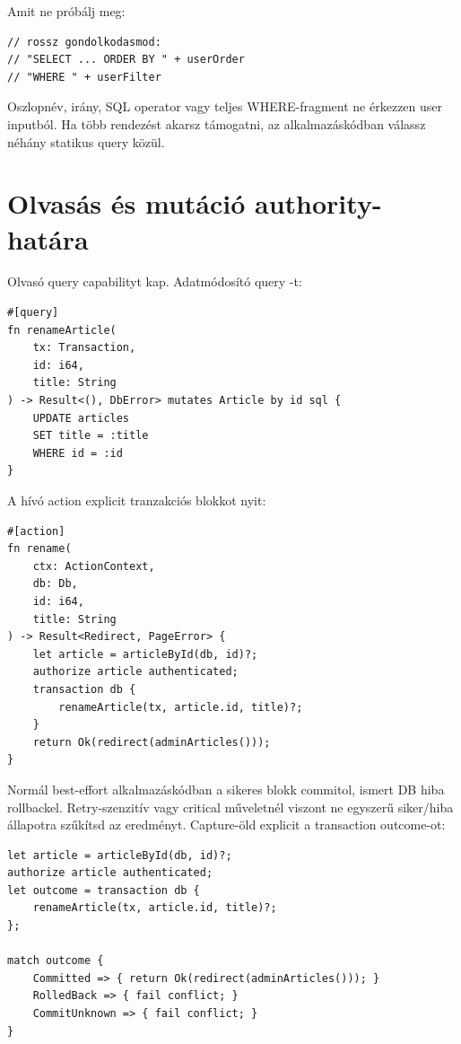 Amit ne próbálj meg:

\begin{lstlisting}
// rossz gondolkodasmod:
// "SELECT ... ORDER BY " + userOrder
// "WHERE " + userFilter
\end{lstlisting}

Oszlopnév,  irány, SQL operator vagy teljes WHERE-fragment ne érkezzen user inputból. Ha több rendezést akarsz támogatni, az alkalmazáskódban válassz néhány statikus query közül.

\section{Olvasás és mutáció authority-határa}

Olvasó query  capabilityt kap. Adatmódosító query -t:

\begin{lstlisting}[language=Velran]
#[query]
fn renameArticle(
    tx: Transaction,
    id: i64,
    title: String
) -> Result<(), DbError> mutates Article by id sql {
    UPDATE articles
    SET title = :title
    WHERE id = :id
}
\end{lstlisting}

A hívó action explicit tranzakciós blokkot nyit:

\begin{lstlisting}[language=Velran]
#[action]
fn rename(
    ctx: ActionContext,
    db: Db,
    id: i64,
    title: String
) -> Result<Redirect, PageError> {
    let article = articleById(db, id)?;
    authorize article authenticated;
    transaction db {
        renameArticle(tx, article.id, title)?;
    }
    return Ok(redirect(adminArticles()));
}
\end{lstlisting}

Normál best-effort alkalmazáskódban a sikeres blokk commitol, ismert DB hiba rollbackel. Retry-szenzitív vagy critical műveletnél viszont ne egyszerű siker/hiba állapotra szűkítsd az eredményt. Capture-öld explicit a transaction outcome-ot:

\begin{lstlisting}[language=Velran]
let article = articleById(db, id)?;
authorize article authenticated;
let outcome = transaction db {
    renameArticle(tx, article.id, title)?;
};

match outcome {
    Committed => { return Ok(redirect(adminArticles())); }
    RolledBack => { fail conflict; }
    CommitUnknown => { fail conflict; }
}
\end{lstlisting}

